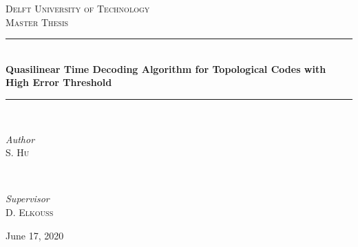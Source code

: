 \begin{titlepage}
	\newcommand{\HRule}{\rule{\linewidth}{0.3mm}}
	\center

	\textsc{\Large Delft University of Technology}\\[1.5cm]

	\textsc{\large Master Thesis}\\[0.5cm]

    \vfill

	\HRule\\[1cm]

	{\huge\bfseries Quasilinear Time Decoding Algorithm for Topological Codes with High Error Threshold}\\[0.4cm]

	\HRule\\[1.8cm]

	\begin{minipage}{0.4\textwidth}
		\begin{flushleft}
			\large
			\textit{Author}\\
			S. \textsc{Hu}
		\end{flushleft}
	\end{minipage}
	~
	\begin{minipage}{0.4\textwidth}
		\begin{flushright}
			\large
			\textit{Supervisor}\\
			D. \textsc{Elkouss} %
		\end{flushright}
	\end{minipage}



	\vfill\vfill\vfill %

	{\large June 17, 2020} %
	\vfill %

\end{titlepage}
